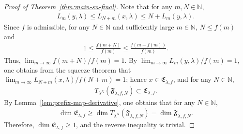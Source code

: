 \documentclass[12pt,reqno]{amsart}
\theoremstyle{definition}
\theoremstyle{plain}
\begin{document}
\begin{proof}[Proof of Theorem~\ref{thm:main-sn-final}]
Note that for any $m,N\in\mathbb{N}$,
\begin{align*}
    L_m(y,\lambda)
    \leq L_{N+m}(x,\lambda)
    \leq N+L_m(y,\lambda).
\end{align*}
Since $f$ is admissible, for any $N\in\mathbb{N}$ and sufficiently large $m\in\mathbb{N}$, $N\leq f(m)$ and 
\begin{align*}
    1\leq\frac{f(m+N)}{f(m)}\leq\frac{f(m+f(m))}{f(m)}.
\end{align*}
Thus, $\lim_{m\to\infty}f(m+N)/f(m)=1$. By $\lim_{m\to\infty}{L_m(y,\lambda)}/{f(m)}=1$, one obtains from the squeeze theorem that $\lim_{m\to\infty}{L_{N+m}(x,\lambda)}/{f(N+m)}=1$; hence $x\in{\mathfrak E}_{\lambda,f}$, and for any $N\in\mathbb{N}$,
\begin{align*}
    T_{\lambda^N}\!\left(\mathfrak{F}_{\lambda,f,N}\right)
    \subset{\mathfrak E}_{\lambda,f}.
\end{align*}
By Lemma~\ref{lem:prefix-map-derivative}, one obtains that for any $N\in\mathbb{N}$, 
\begin{align*}
    \dim{{\mathfrak E}_{\lambda,f}}
    \geq \dim{T_{\lambda^N}\!\left(\mathfrak{F}_{\lambda,f,N}\right)}
    = \dim{\mathfrak{F}_{\lambda,f,N}}.
\end{align*}
Therefore, $\dim{\mathfrak{E}_{\lambda,f}}\geq1$, and the reverse inequality is trivial.
\end{proof}

 

\end{document}
